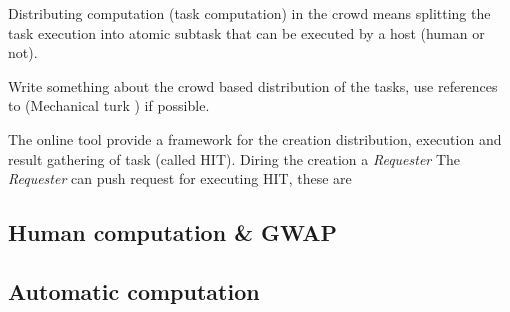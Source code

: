 




Distributing computation (task computation) in the crowd means splitting
the task execution into atomic subtask that can be executed by a host
(human or not).

Write something about the crowd based distribution of the tasks, use references
to (Mechanical turk \cite{little2010turkit}) if possible.

The online tool  provide a framework for the creation
distribution, execution and result gathering of task (called \ac{HIT}).
Diring the creation a \emph{Requester} 
The \emph{Requester} can push request for executing \ac{HIT}, these are 

\subsection{Human computation \& \acs{GWAP}}
\label{sec:bg:crowd:human}


\subsection{Automatic computation}
\label{sec:bg:crowd:auto}
